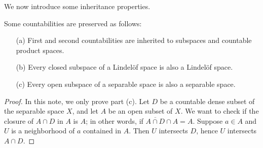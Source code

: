 We now introduce some inheritance properties.
\begin{prop}
    Some countabilities are preserved as follows:
    \begin{enumerate}
        \item[(a)] First and second countabilities are inherited to subspaces and countable product spaces.
        \item[(b)] Every closed subspace of a Lindel\"{o}f space is also a Lindel\"{o}f space.
        \item[(c)] Every open subspace of a separable space is also a separable space.
    \end{enumerate}
\end{prop}
\begin{proof}
    In this note, we only prove part (c).
    Let $D$ be a countable dense subset of the separable space $X$, and let $A$ be an open subset of $X$.
    We want to check if the closure of $A\cap D$ in $A$ is $A$; in other words, if $\overline{A\cap D}\cap A=A$.
    Suppose $a\in A$ and $U$ is a neighborhood of $a$ contained in $A$.
    Then $U$ intersects $D$, hence $U$ intersects $A\cap D$.
\end{proof}

